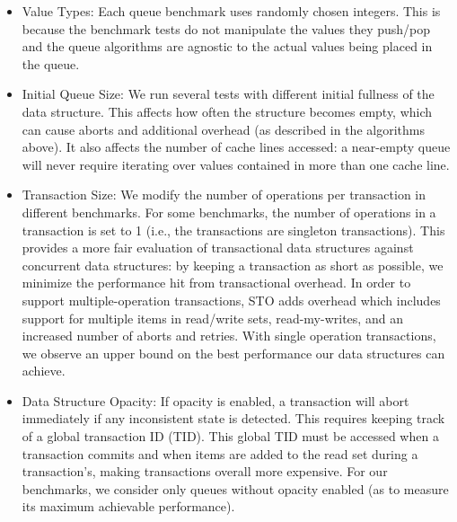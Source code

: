 \begin{itemize}
\item Value Types: Each queue benchmark uses randomly chosen integers. This is because the benchmark tests do not manipulate the values they push/pop and the queue algorithms are agnostic to the actual values being placed in the queue.

\item Initial Queue Size: We run several tests with different initial fullness of the data structure. This affects how often the structure becomes empty, which can cause aborts and additional overhead (as described in the algorithms above). It also affects the number of cache lines accessed: a near-empty queue will never require iterating over values contained in more than one cache line.

\item Transaction Size: We modify the number of operations per transaction in different benchmarks. For some benchmarks, the number of operations in a transaction is set to 1 (i.e., the transactions are singleton transactions). This provides a more fair evaluation of transactional data structures against concurrent data structures: by keeping a transaction as short as possible, we minimize the performance hit from transactional overhead. In order to support multiple-operation transactions, STO adds overhead which includes support for multiple items in read/write sets, read-my-writes, and an increased number of aborts and retries. With single operation transactions, we observe an upper bound on the best performance our data structures can achieve.

\item Data Structure Opacity: If opacity is enabled, a transaction will abort immediately if any inconsistent state is detected. This requires keeping track of a global transaction ID (TID). This global TID must be accessed when a transaction commits and when items are added to the read set during a transaction's, making transactions overall more expensive. For our benchmarks, we consider only queues without opacity enabled (as to measure its maximum achievable performance).
\end{itemize}

